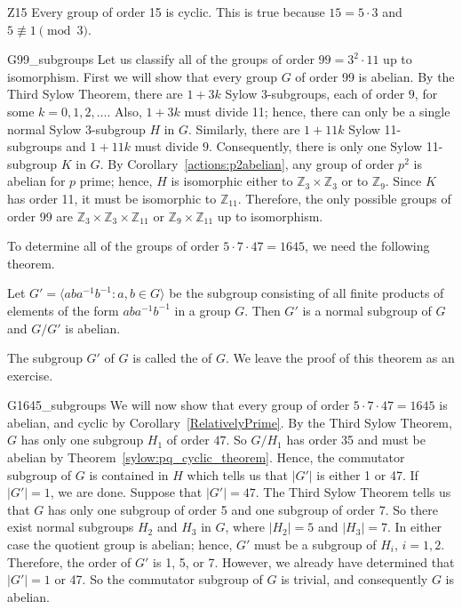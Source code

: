  
\begin{example}{Z15}
Every group of order 15 is cyclic.  This is true because $15 = 5 \cdot
3$ and $5 \not\equiv 1 \pmod{3}$. 
\end{example}
 
 
\begin{example}{G99_subgroups}
Let us classify all of the groups of order $99 = 3^2 \cdot 11$ up to
isomorphism. First we will show that every group $G$ of order 99 is
abelian.  By the Third Sylow Theorem, there are $1 + 3k$ Sylow
3-subgroups, each of order $9$, for some $k = 0, 1, 2, \ldots$.  Also,
$1 + 3k$ must divide 11; hence, there can only be a single normal
Sylow 3-subgroup $H$ in $G$.  Similarly, there are $1 +11k$ Sylow
11-subgroups and $1 +11k$ must divide $9$.  Consequently, there is
only one Sylow 11-subgroup $K$ in $G$.  By Corollary~\ref{actions:p2abelian}, any group
of order $p^2$ is abelian for $p$ prime; hence, $H$ is isomorphic either 
to ${\mathbb Z}_3 \times {\mathbb Z}_3$ or to ${\mathbb Z}_9$.  Since $K$ has 
order 11, it must be isomorphic to ${\mathbb Z}_{11}$.  Therefore, the only
possible groups of order 99 are ${\mathbb Z}_3 \times {\mathbb Z}_3 \times
{\mathbb Z}_{11}$ or ${\mathbb Z}_9 \times {\mathbb Z}_{11}$ up to isomorphism.
\end{example}
 

 
 
To determine all of the groups of order $5 \cdot 7 \cdot 47 = 1645$,
we need the following theorem. 
 
 
\begin{theorem}\label{sylow:commutator_subgroup_theorem}
Let $G' = \langle a b a^{-1} b^{-1} : a, b \in G \rangle$ be the
subgroup  consisting of all finite products of elements of the form
$aba^{-1}b^{-1}$ in a group $G$. Then $G'$ is a normal subgroup of $G$
and $G/G'$ is abelian. 
\end{theorem}
 
 
The subgroup $G'$ of $G$ is called the  of $G$. We leave the proof of
this theorem as an exercise. 
 
 
\begin{example}{G1645_subgroups}
We will now show that every group of order $5 \cdot 7 \cdot 47 =
1645$ is abelian, and cyclic by Corollary~\ref{RelativelyPrime}. By the Third Sylow
Theorem, $G$ has only one subgroup $H_1$ of order $47$.  So $G/H_1$
has order 35 and must be abelian by Theorem~\ref{sylow:pq_cyclic_theorem}. Hence, the
commutator subgroup of $G$ is contained in $H$ which tells us that
$|G'|$ is either 1 or 47. If $|G'|=1$, we are done. Suppose that
$|G'|=47$. The Third Sylow Theorem tells us that $G$ has only one
subgroup of order 5 and one subgroup of order 7.  So there exist
normal subgroups $H_2$  and $H_3$ in $G$, where $|H_2| = 5$ and $|H_3|
= 7$. In either case the quotient group is abelian; hence, $G'$ must
be a subgroup of $H_i$, $i= 1, 2$. Therefore, the order of $G'$ is 1,
5, or 7. However, we already have determined that $|G'| =1$ or 47. So
the commutator subgroup of $G$ is trivial, and consequently $G$ is
abelian.
\end{example}
 
